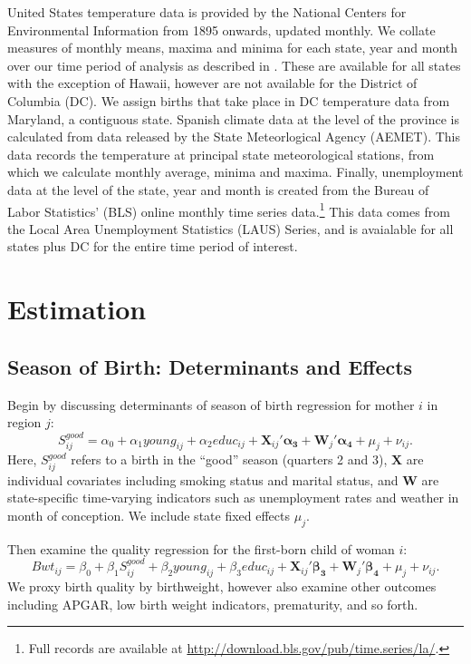 \documentclass[a4paper, 11 pt]{article}
\theoremstyle{plain}
\begin{document}
\begin{spacing}{1.4}
United States temperature data is provided by the National Centers for 
Environmental Information from 1895 onwards, updated monthly.  We collate 
measures of monthly means, maxima and minima for each state, year and month 
over our time period of analysis as described in \citet{Voseetal2014}. These are 
available for all states with the exception of Hawaii, however are not available 
for the District of Columbia (DC). We assign births that take place in DC 
temperature data from Maryland, a contiguous state.  Spanish climate data at the 
level of the province is calculated from data released by the State Meteorlogical 
Agency (AEMET). This data records the temperature at principal state 
meteorological stations, from which we calculate monthly average, minima and 
maxima. Finally, unemployment data at the level of the state, year and month is 
created from the Bureau of Labor Statistics' (BLS) online monthly time series 
data.\footnote{Full records are available at 
\href{http://download.bls.gov/pub/time.series/la/}%
{http://download.bls.gov/pub/time.series/la/}.} This data comes from the Local 
Area Unemployment Statistics (LAUS) Series, and is avaialable for all states 
plus DC for the entire time period of interest.

\section{Estimation}
\subsection{Season of Birth: Determinants and Effects}

Begin by discussing determinants of season of birth regression for mother $i$ in 
region $j$:
\begin{equation}
\label{eqn:season}
S^{good}_{ij} = \alpha_0 + \alpha_1 young_{ij} + \alpha_2 educ_{ij}  + 
\mathbf{X}_{ij}'\mathbf{\alpha_3} + \mathbf{W}_{j}'\mathbf{\alpha_4} + \mu_j +\nu_{ij}. 
\end{equation}
Here, $S^{good}_{ij}$ refers to a birth in the ``good'' season (quarters 2 and 3),
$\mathbf{X}$ are individual covariates including smoking status and marital status,
and $\mathbf{W}$ are state-specific time-varying indicators such as unemployment
rates and weather in month of conception.  We include state fixed effects $\mu_j$.

Then examine the quality regression for the first-born child of woman $i$:
\begin{equation}
\label{eqn:quality}
Bwt_{ij} = \beta_0 + \beta_1 S^{good}_{ij} + \beta_2 young_{ij} + \beta_3 educ_{ij}  + 
\mathbf{X}_{ij}'\mathbf{\beta_3} + \mathbf{W}_{j}'\mathbf{\beta_4} + \mu_j +\nu_{ij}. 
\end{equation}
We proxy birth quality by birthweight, however also examine other outcomes 
including APGAR, low birth weight indicators, prematurity, and so forth.



\end{spacing}
\end{document}

